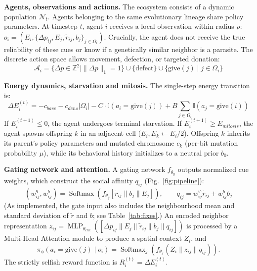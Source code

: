 \documentclass{article}
\begin{document}
\textbf{Agents, observations and actions.} The ecosystem consists of a dynamic population $\mathcal{N}_t$. Agents belonging to the same evolutionary lineage share policy parameters. At timestep $t$, agent $i$ receives a local observation within radius $\rho$: $o_i = \left( E_i, \{ \Delta p_{ij}, E_j, \tilde{r}_{ij}, b_j \}_{j \in \Omega_i} \right)$. Crucially, the agent does not receive the true reliability of these cues or know if a genetically similar neighbor is a parasite. The discrete action space allows movement, defection, or targeted donation:
\begin{equation}
    \mathcal{A}_i = \{ \Delta p \in \mathbb{Z}^2 \mid \|\Delta p\|_1 = 1 \} \cup \{ \text{defect} \} \cup \{ \text{give}(j) \mid j \in \Omega_i \}
\end{equation}

\textbf{Energy dynamics, starvation and mitosis.} The single-step energy transition is:
\begin{equation}
    \Delta E_i^{(t)} = - c_{base} - c_{dens} |\Omega_i| - C \cdot \mathbb{I}(a_i = \text{give}(j)) + B \sum_{j \in \Omega_i} \mathbb{I}(a_j = \text{give}(i))
\end{equation}
If $E_i^{(t+1)} \le 0$, the agent undergoes terminal starvation. If $E_i^{(t+1)} \ge E_{mitosis}$, the agent spawns offspring $k$ in an adjacent cell ($E_i, E_k \leftarrow E_i/2$). Offspring $k$ inherits its parent's policy parameters and mutated chromosome $c_k$ (per-bit mutation probability $\mu$), while its behavioral history initializes to a neutral prior $b_0$.

\textbf{Gating network and attention.} A gating network $f_{\theta_g}$ outputs normalized cue weights, which construct the social affinity $q_{ij}$ (Fig.~\ref{fig:pipeline}):
\begin{equation}
    (w^g_{ij}, w^b_{ij}) = \operatorname{Softmax}\left( f_{\theta_g} [ \tilde{r}_{ij} \parallel b_j \parallel E_j ] \right), \qquad q_{ij} = w^g_{ij} \tilde{r}_{ij} + w^b_{ij} b_j
\end{equation}
(As implemented, the gate input also includes the neighbourhood mean and standard deviation of $\tilde r$ and $b$; see Table~\ref{tab:fixes}.)
An encoded neighbor representation $z_{ij} = \operatorname{MLP}_{\theta_{enc}}([ \Delta p_{ij} \parallel E_j \parallel \tilde{r}_{ij} \parallel b_j \parallel q_{ij} ])$ is processed by a Multi-Head Attention module to produce a spatial context $Z_i$, and
\begin{equation}
    \pi_\phi(a_i = \text{give}(j) \mid o_i) = \operatorname{Softmax}_j \left( f_{\theta_\pi} (Z_i \parallel z_{ij} \parallel q_{ij}) \right).
\end{equation}
The strictly selfish reward function is $R_i^{(t)} = \Delta E_i^{(t)}$.
\end{document}
